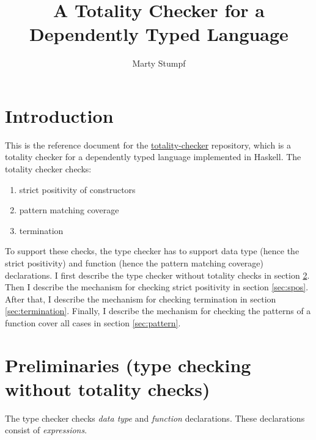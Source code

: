 \documentclass[acmsmall]{acmart}
\begin{document}
\title{A Totality Checker for a Dependently Typed Language}

%
\author{Marty Stumpf}

%

%
%
\maketitle
\thispagestyle{empty}
\section{Introduction}

This is the reference document for the
\href{https://github.com/thealmarty/totality-checker}{totality-checker}
repository, which is a totality checker for a dependently typed language
implemented in Haskell. The totality checker checks:

\begin{enumerate}
  \item strict positivity of constructors
  \item pattern matching coverage
  \item termination
\end{enumerate}

To support these checks, the type checker has to support data type (hence the
strict positivity) and function (hence the pattern matching coverage)
declarations. I first describe the type checker without totality checks in
section \ref{sec:prelim}. Then I describe the mechanism for checking strict positivity
in section \ref{sec:spos}. After that, I describe the mechanism for checking
termination in section \ref{sec:termination}. Finally, I describe the mechanism
for checking the patterns of a function cover all cases in section
\ref{sec:pattern}.

\section{Preliminaries (type checking without totality checks)}
\label{sec:prelim}
The type checker checks \textit{data type} and \textit{function} declarations. These declarations
consist of \textit{expressions}.
\end{document}
